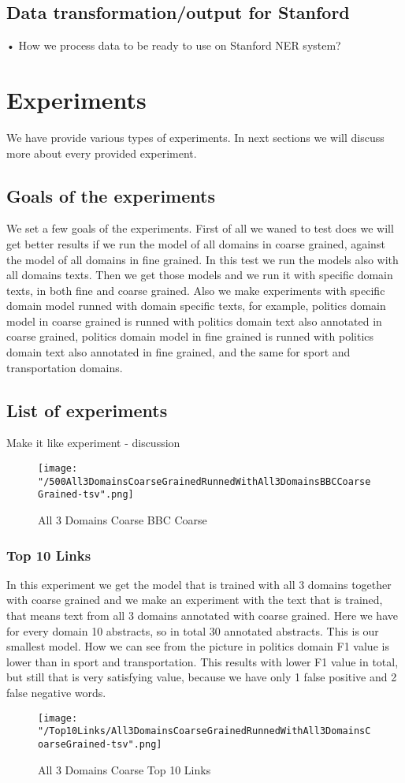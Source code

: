 \documentclass[thesis=M,english]{FITthesis}[2018/05/30]
\begin{document}
\section{Data transformation/output for Stanford}
•	How we process data to be ready to use on Stanford NER system?


\chapter{Experiments}
We have provide various types of experiments. In next sections we will discuss more about every provided experiment.
\section{Goals of the experiments}
We set a few goals of the experiments. First of all we waned to test does we will get better results if we run the model of all domains in coarse grained, against the model of all domains in fine grained. In this test we run the models also with all domains texts. Then we get those models and we run it with specific domain texts, in both fine and coarse grained. Also we make experiments with specific domain model runned with domain specific texts, for example, politics domain model in coarse grained is runned with politics domain text also annotated in coarse grained, politics domain model in fine grained is runned with politics domain text also annotated in fine grained, and the same for sport and transportation domains.

\section{List of experiments}
Make it like experiment - discussion

	\begin{figure}\centering
		\texttt{[image: "/500All3DomainsCoarseGrainedRunnedWithAll3DomainsBBCCoarseGrained-tsv".png]}
		\caption{All 3 Domains Coarse BBC Coarse}\label{}
	\end{figure}

\subsection{Top 10 Links}
	In this experiment we get the model that is trained with all 3 domains together with coarse grained and we make an experiment with the text that is trained, that means text from all 3 domains annotated with coarse grained. 
	Here we have for every domain 10 abstracts, so in total 30 annotated abstracts. This is our smallest model.
	How we can see from the picture in politics domain F1 value is lower than in sport and transportation. This results with lower F1 value in total, but still that is very satisfying value, because we have only 1 false positive and 2 false negative words.  
	\begin{figure}\centering
		\texttt{[image: "/Top10Links/All3DomainsCoarseGrainedRunnedWithAll3DomainsCoarseGrained-tsv".png]}
		\caption{All 3 Domains Coarse Top 10 Links}\label{}
	\end{figure}
	
\end{document}
